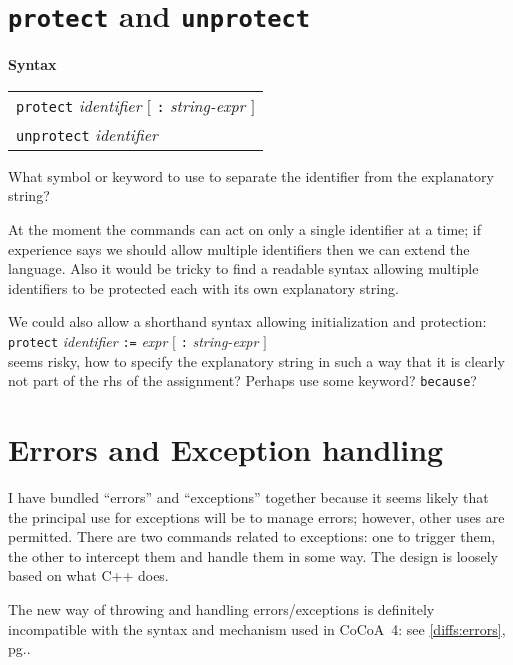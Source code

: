 \documentclass{book}[12,a4paper]
\def\refandpage#1{{\ref{#1}, pg.\pageref{#1}}}
\newenvironment{syntax}
{\goodbreak\noindent\textbf{Syntax}\\
 \begin{tabular}{|p{0.9\textwidth}|}\hline}
{\\\hline\end{tabular}}
\begin{document}
\section{\texttt{protect} and \texttt{unprotect}}
\label{keyword:protect}

\begin{syntax}
\texttt{protect} \textit{identifier} $[$ \texttt{:} \textit{string-expr} $]$\\
\texttt{unprotect} \textit{identifier}
\end{syntax}

What symbol or keyword to use to separate the identifier from the explanatory string?

At the moment the commands can act on only a single identifier at a time; if experience
says we should allow multiple identifiers then we can extend the language.  Also it would
be tricky to find a readable syntax allowing multiple identifiers to be protected each
with its own explanatory string.

We could also allow a shorthand syntax allowing initialization and protection:\\
\texttt{protect} \textit{identifier} \texttt{:=} \textit{expr} $[$ \texttt{:} \textit{string-expr} $]$\\

 seems risky, how to specify the explanatory string in such a way that it is clearly not part of the rhs of the assignment?  Perhaps use some keyword?  \texttt{because}?



\section{Errors and Exception handling}
\label{exceptions}

I have bundled ``errors'' and ``exceptions'' together because it seems
likely that the principal use for exceptions will be to manage errors;
however, other uses are permitted.  There are two commands related to
exceptions: one to trigger them, the other to intercept them and
handle them in some way.  The design is loosely based on what C++
does.

The new way of throwing and handling errors/exceptions is definitely
incompatible with the syntax and mechanism used in CoCoA~4: see
\refandpage{diffs:errors}.

\end{document}
